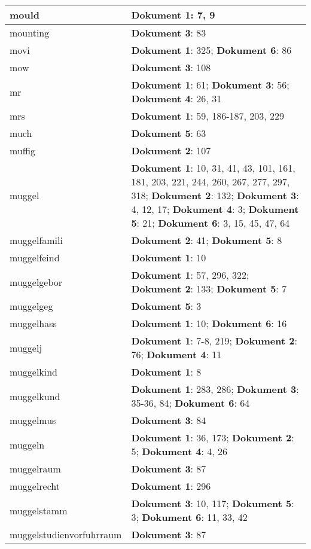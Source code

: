 \documentclass[a5paper]{article}
\begin{document}
\begin{longtable}[l]{|l|p{3in}|}
\hline
mould & \textbf{Dokument 1}: 7, 9 \\
\hline
mounting & \textbf{Dokument 3}: 83 \\
\hline
movi & \textbf{Dokument 1}: 325; \textbf{Dokument 6}: 86 \\
\hline
mow & \textbf{Dokument 3}: 108 \\
\hline
mr & \textbf{Dokument 1}: 61; \textbf{Dokument 3}: 56; \textbf{Dokument 4}: 26, 31 \\
\hline
mrs & \textbf{Dokument 1}: 59, 186-187, 203, 229 \\
\hline
much & \textbf{Dokument 5}: 63 \\
\hline
muffig & \textbf{Dokument 2}: 107 \\
\hline
muggel & \textbf{Dokument 1}: 10, 31, 41, 43, 101, 161, 181, 203, 221, 244, 260, 267, 277, 297, 318; \textbf{Dokument 2}: 132; \textbf{Dokument 3}: 4, 12, 17; \textbf{Dokument 4}: 3; \textbf{Dokument 5}: 21; \textbf{Dokument 6}: 3, 15, 45, 47, 64 \\
\hline
muggelfamili & \textbf{Dokument 2}: 41; \textbf{Dokument 5}: 8 \\
\hline
muggelfeind & \textbf{Dokument 1}: 10 \\
\hline
muggelgebor & \textbf{Dokument 1}: 57, 296, 322; \textbf{Dokument 2}: 133; \textbf{Dokument 5}: 7 \\
\hline
muggelgeg & \textbf{Dokument 5}: 3 \\
\hline
muggelhass & \textbf{Dokument 1}: 10; \textbf{Dokument 6}: 16 \\
\hline
muggelj & \textbf{Dokument 1}: 7-8, 219; \textbf{Dokument 2}: 76; \textbf{Dokument 4}: 11 \\
\hline
muggelkind & \textbf{Dokument 1}: 8 \\
\hline
muggelkund & \textbf{Dokument 1}: 283, 286; \textbf{Dokument 3}: 35-36, 84; \textbf{Dokument 6}: 64 \\
\hline
muggelmus & \textbf{Dokument 3}: 84 \\
\hline
muggeln & \textbf{Dokument 1}: 36, 173; \textbf{Dokument 2}: 5; \textbf{Dokument 4}: 4, 26 \\
\hline
muggelraum & \textbf{Dokument 3}: 87 \\
\hline
muggelrecht & \textbf{Dokument 1}: 296 \\
\hline
muggelstamm & \textbf{Dokument 3}: 10, 117; \textbf{Dokument 5}: 3; \textbf{Dokument 6}: 11, 33, 42 \\
\hline
muggelstudienvorfuhrraum & \textbf{Dokument 3}: 87 \\

\end{longtable}
\end{document}
